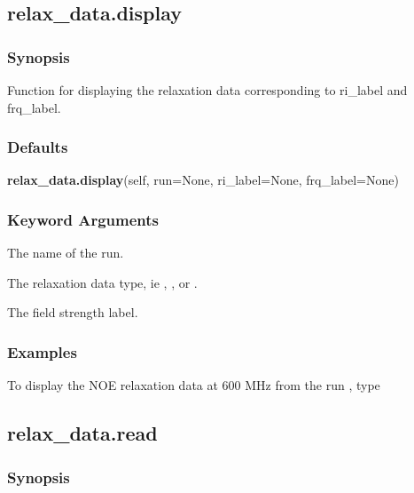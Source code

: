 


\newpage

\subsection{relax\_data.display}


\subsubsection{Synopsis}

Function for displaying the relaxation data corresponding to ri\_label and frq\_label.

\subsubsection{Defaults}

\textsf{\textbf{relax\_data.display}(self, run=None, ri\_label=None, frq\_label=None)}


\subsubsection{Keyword Arguments}


  The name of the run.

  The relaxation data type, ie 
, 
, or 
.

  The field strength label.

\subsubsection{Examples}

To display the NOE relaxation data at 600 MHz from the run 
, type




\newpage

\subsection{relax\_data.read}


\subsubsection{Synopsis}

